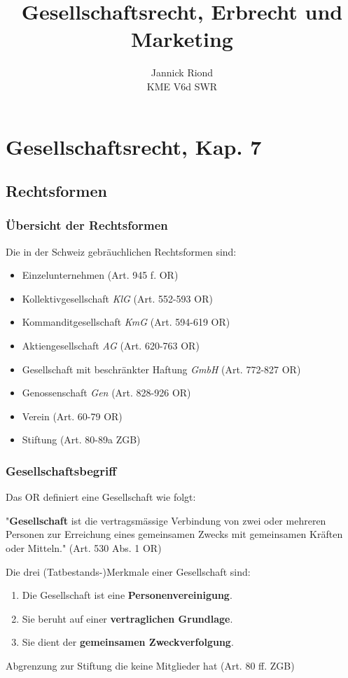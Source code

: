 \documentclass[12pt]{article}
\begin{document}
 
\title{Gesellschaftsrecht, Erbrecht und Marketing}
\author{Jannick Riond\\
KME V6d SWR}

\maketitle
\newpage
\tableofcontents
\newpage

\section{Gesellschaftsrecht, Kap. 7}
\subsection{Rechtsformen}
\subsubsection{Übersicht der Rechtsformen}
Die in der Schweiz gebräuchlichen Rechtsformen sind:
\begin{itemize}
    \item Einzelunternehmen (Art. 945 f. OR)
    \item Kollektivgesellschaft \textit{KlG} (Art. 552-593 OR)
    \item Kommanditgesellschaft \textit{KmG} (Art. 594-619 OR)
    \item Aktiengesellschaft \textit{AG} (Art. 620-763 OR)
    \item Gesellschaft mit beschränkter Haftung \textit{GmbH} (Art. 772-827 OR)
    \item Genossenschaft \textit{Gen} (Art. 828-926 OR)
    \item Verein (Art. 60-79 OR)
    \item Stiftung (Art. 80-89a ZGB)
\end{itemize}

\subsubsection{Gesellschaftsbegriff}\label{Gesellschaftsbegriff}
Das OR definiert eine Gesellschaft wie folgt:
\begin{Definitionsbox}
"\textbf{Gesellschaft} ist die vertragsmässige Verbindung von zwei oder mehreren Personen zur Erreichung eines gemeinsamen Zwecks mit gemeinsamen Kräften oder Mitteln." (Art. 530 Abs. 1 OR)
\end{Definitionsbox}
Die drei (Tatbestands-)Merkmale einer Gesellschaft sind:
\begin{enumerate}
    \item Die Gesellschaft ist eine \textbf{Personenvereinigung}.
    \item Sie beruht auf einer \textbf{vertraglichen Grundlage}.
    \item Sie dient der \textbf{gemeinsamen Zweckverfolgung}.
\end{enumerate}
\textrightarrow Abgrenzung zur Stiftung die keine Mitglieder hat (Art. 80 ff. ZGB)
\end{document}
